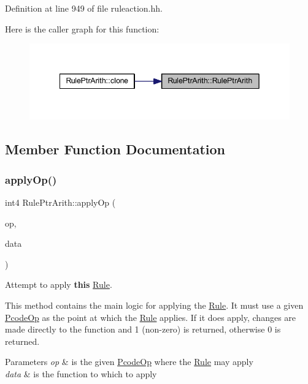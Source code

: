 Definition at line 949 of file ruleaction.\+hh.

Here is the caller graph for this function\+:
\nopagebreak
\begin{figure}[H]
\begin{center}
\leavevmode
\includegraphics[width=342pt]{class_rule_ptr_arith_a139210db9ccd8becc85ce3ec5467f04a_icgraph}
\end{center}
\end{figure}


\subsection{Member Function Documentation}
\mbox{\label{class_rule_ptr_arith_a8b6d5d16ceb0884f97bebd712b9f6852}} 
\subsubsection{\texorpdfstring{applyOp()}{applyOp()}}
{\footnotesize\ttfamily int4 Rule\+Ptr\+Arith\+::apply\+Op (\begin{DoxyParamCaption}\item[{\mbox{\hyperlink{class_pcode_op}{Pcode\+Op}} $\ast$}]{op,  }\item[{\mbox{\hyperlink{class_funcdata}{Funcdata}} \&}]{data }\end{DoxyParamCaption})\hspace{0.3cm}{\ttfamily [virtual]}}



Attempt to apply {\bfseries{this}} \mbox{\hyperlink{class_rule}{Rule}}. 

This method contains the main logic for applying the \mbox{\hyperlink{class_rule}{Rule}}. It must use a given \mbox{\hyperlink{class_pcode_op}{Pcode\+Op}} as the point at which the \mbox{\hyperlink{class_rule}{Rule}} applies. If it does apply, changes are made directly to the function and 1 (non-\/zero) is returned, otherwise 0 is returned. 
\begin{DoxyParams}{Parameters}
{\em op} & is the given \mbox{\hyperlink{class_pcode_op}{Pcode\+Op}} where the \mbox{\hyperlink{class_rule}{Rule}} may apply \\
\hline
{\em data} & is the function to which to apply \\
\hline
\end{DoxyParams}


